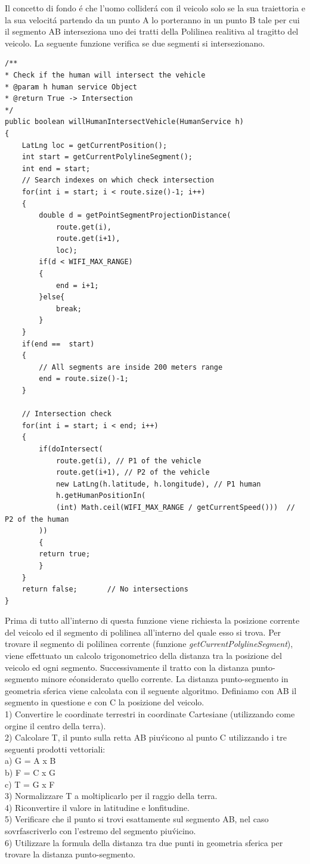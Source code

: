 \documentclass[conference]{IEEEtran}
\begin{document}
Il concetto di fondo \'e che l'uomo collider\'a con il veicolo solo se la sua traiettoria e la sua velocit\'a partendo da un punto A lo porteranno in un punto B tale per cui il segmento AB interseziona uno dei tratti della Polilinea realitiva al tragitto del veicolo.
La seguente funzione verifica se due segmenti si intersezionano.

\begin{lstlisting}
/**
* Check if the human will intersect the vehicle
* @param h human service Object
* @return True -> Intersection
*/
public boolean willHumanIntersectVehicle(HumanService h) 
{
	LatLng loc = getCurrentPosition();
	int start = getCurrentPolylineSegment();
	int end = start;
	// Search indexes on which check intersection
	for(int i = start; i < route.size()-1; i++)
	{
		double d = getPointSegmentProjectionDistance(
			route.get(i),
			route.get(i+1),
			loc);
		if(d < WIFI_MAX_RANGE)
		{
			end = i+1;
		}else{
			break;
		}
	}
	if(end ==  start)
	{
		// All segments are inside 200 meters range
		end = route.size()-1;
	}

	// Intersection check
	for(int i = start; i < end; i++)
	{
		if(doIntersect(
			route.get(i), // P1 of the vehicle
			route.get(i+1), // P2 of the vehicle
			new LatLng(h.latitude, h.longitude), // P1 human
			h.getHumanPositionIn(
			(int) Math.ceil(WIFI_MAX_RANGE / getCurrentSpeed()))  // P2 of the human
		))
		{
		return true;
		}
	}
	return false;       // No intersections
}

\end{lstlisting}
Prima di tutto all'interno di questa funzione viene richiesta la posizione corrente del veicolo ed il segmento di polilinea all'interno del quale esso si trova. Per trovare il segmento di polilinea corrente (funzione \textit{getCurrentPolylineSegment}), viene effettuato un calcolo trigonometrico della distanza tra la posizione del veicolo ed ogni segmento. Successivamente il tratto con la distanza punto-segmento minore e\' considerato quello corrente. La distanza punto-segmento in geometria sferica viene calcolata con il seguente algoritmo. Definiamo con AB il segmento in questione e con C la posizione del veicolo.\\
1) Convertire le coordinate terrestri in coordinate Cartesiane (utilizzando come orgine il centro della terra).\\
2) Calcolare T, il punto sulla retta AB piu\' vicono al  punto C utilizzando i tre seguenti prodotti vettoriali:
\\a) G = A x B\\
b) F = C x G\\
c) T = G x F\\
3) Normalizzare T a moltiplicarlo per il raggio della terra.\\
4) Riconvertire il valore in latitudine e lonfitudine.\\
5) Verificare che il punto si trovi esattamente sul segmento AB, nel caso sovrfascriverlo con l'estremo del segmento piu\' vicino.\\
6) Utilizzare la formula della distanza tra due punti in geometria sferica per trovare la distanza punto-segmento.\\
\end{document}
